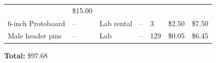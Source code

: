 \documentclass[]{article}
\begin{document}
\begin{longtable}[]{@{}lllllll@{}}
\begin{minipage}[t]{0.06\columnwidth}
\end{minipage} & \begin{minipage}[t]{0.07\columnwidth}\raggedright
\$15.00\strut
\end{minipage}\tabularnewline
\begin{minipage}[t]{0.15\columnwidth}\raggedright
6-inch Protoboard\strut
\end{minipage} & \begin{minipage}[t]{0.15\columnwidth}\raggedright
--\strut
\end{minipage} & \begin{minipage}[t]{0.10\columnwidth}\raggedright
Lab rental\strut
\end{minipage} & \begin{minipage}[t]{0.17\columnwidth}\raggedright
--\strut
\end{minipage} & \begin{minipage}[t]{0.11\columnwidth}\raggedright
3\strut
\end{minipage} & \begin{minipage}[t]{0.06\columnwidth}\raggedright
\$2.50\strut
\end{minipage} & \begin{minipage}[t]{0.07\columnwidth}\raggedright
\$7.50\strut
\end{minipage}\tabularnewline
\begin{minipage}[t]{0.15\columnwidth}\raggedright
Male header pins\strut
\end{minipage} & \begin{minipage}[t]{0.15\columnwidth}\raggedright
--\strut
\end{minipage} & \begin{minipage}[t]{0.10\columnwidth}\raggedright
Lab\strut
\end{minipage} & \begin{minipage}[t]{0.17\columnwidth}\raggedright
--\strut
\end{minipage} & \begin{minipage}[t]{0.11\columnwidth}\raggedright
129\strut
\end{minipage} & \begin{minipage}[t]{0.06\columnwidth}\raggedright
\$0.05\strut
\end{minipage} & \begin{minipage}[t]{0.07\columnwidth}\raggedright
\$6.45\strut
\end{minipage}\tabularnewline
\bottomrule
\end{longtable}

\textbf{Total:} \$97.68

{}

\end{document}
